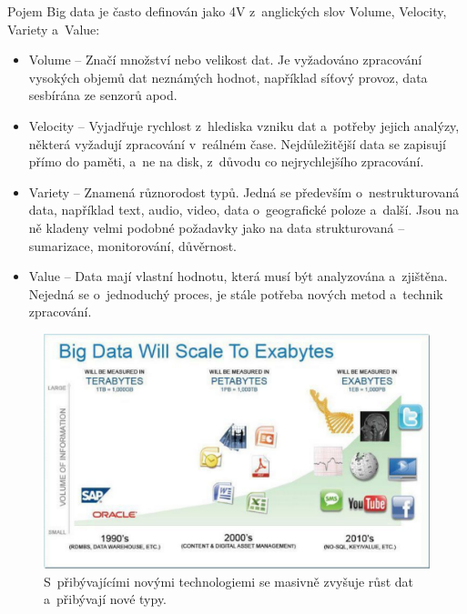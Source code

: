 
\vspace{0.5cm}

\noindent Pojem Big data je často definován jako 4V z~anglických slov Volume, Velocity, Variety a~Value: \cite{oracleBigData}

\begin{itemize}
\item Volume – Značí množství nebo velikost dat. Je vyžadováno zpracování vysokých objemů dat neznámých hodnot, například síťový provoz, data sesbírána ze senzorů apod.

\item Velocity – Vyjadřuje rychlost z~hlediska vzniku dat a~potřeby jejich analýzy, některá vyžadují zpracování v~reálném čase. Nejdůležitější data se zapisují přímo do paměti, a~ne na disk, z~důvodu co nejrychlejšího zpracování.

\item Variety – Znamená různorodost typů. Jedná se především o~nestrukturovaná data, například text, audio, video, data o~geografické poloze a~další. Jsou na ně kladeny velmi podobné požadavky jako na data strukturovaná – sumarizace, monitorování, důvěrnost. \cite{oracleBigData}

\item Value – Data mají vlastní hodnotu, která musí být analyzována a~zjištěna. Nejedná se o~jednoduchý proces, je stále potřeba nových metod a~technik zpracování.
\end{itemize}

\begin{figure}[!h]
  \centering
  \includegraphics[width=15cm]{template-fig/big_data_exabytes.pdf}
  \caption{S~přibývajícími novými technologiemi se masivně zvyšuje růst dat a~přibývají nové typy. \cite{rajeshBigData}}
  \label{FIG_BigDataExabytes}
\end{figure}

